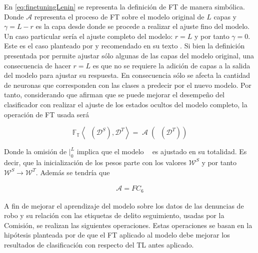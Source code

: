 \documentclass[onecolumn, journal, english, 12pt, a4paper]{IEEEtran} %
\DeclareMathOperator{\ypredsource}{\phi^{S}}
\DeclareMathOperator{\ConvNetOut}{\mathcal{A}}
\theoremstyle{definition}
\begin{document}
En \eqref{eq:finetuningLenin} se representa la definición de FT de
manera simbólica. Donde $\mathcal{A}$ representa el proceso de FT
sobre el modelo original de $L$ capas y $\gamma = L-r$ es la capa
desde donde se procede a realizar el ajuste fino del modelo. Un caso
particular sería el ajuste completo del modelo: $r=L$ y por tanto
$\gamma=0$. Este es el caso planteado por
\citeauthor{tunstall2022natural} y recomendado en su texto
. Si bien la definición presentada por
\textcite{falconi2020transfer} permite ajustar sólo algunas de las
capas del modelo original, una consecuencia de hacer $r=L$ es que no
se requiere la adición de capas a la salida del modelo para ajustar su
respuesta. En consecuencia sólo se afecta la cantidad de neuronas que
corresponden con las clases a predecir por el nuevo modelo. Por tanto,
considerando que \textcite{tunstall2022natural} afirman que se puede
mejorar el desempeño del clasificador con realizar el ajuste de los
estados ocultos del modelo completo, la operación de FT usada será

\begin{equation}\label{eq: finetuningTunstall}
    \mathbb{F_{T}} \left< \ypredsource(\mathcal{D}^{S}), \mathcal{D}^{T} \right> = \ConvNetOut \left(\ypredsource(\mathcal{D}^{T})\right)
\end{equation}

Donde la omisión de $\Bigr\rvert_{0}^{L}$ implica que el modelo
$\ypredsource$ es ajustado en su totalidad. Es decir, que la
inicialización de los pesos parte con los valores $\mathcal{W}^S$ y
por tanto $\mathcal{W}^S\rightarrow \mathcal{W}^T$. Además se tendría
que

\begin{align}\label{eq:finetuningOut}
    \mathcal{A} = FC_{6}
\end{align}


A fin de mejorar el aprendizaje del modelo sobre los datos de las
denuncias de robo y su relación con las etiquetas de delito
seguimiento, usadas por la Comisión, se realizan las siguientes
operaciones. Estas operaciones se basan en la hipótesis planteada por
\textcite{tunstall2022natural} de que el FT aplicado al modelo debe
mejorar los resultados de clasificación con respecto del TL antes
aplicado.
\end{document}
